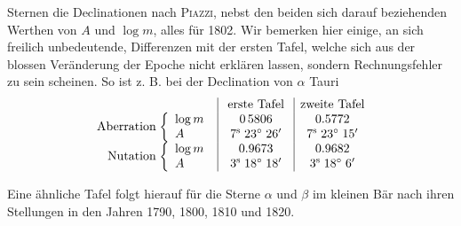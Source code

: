 Sternen die Declinationen nach \textsc{Piazzi}, nebst den beiden sich darauf beziehenden Werthen von $A$ und $\log m$, alles für 1802. Wir bemerken hier einige, an sich freilich unbedeutende, Differenzen mit der ersten Tafel, welche sich aus der blossen Veränderung der Epoche nicht erklären lassen, sondern Rechnungsfehler zu sein scheinen. So ist z. B. bei der Declination von $\alpha$ Tauri \[ \begin{array}{r@{}l|c|c} \multicolumn{2}{c|}{} & \text{erste Tafel} & \text{zweite Tafel}\\ \text{Aberration}\; & \left\{\begin{array}{l}\log m\\ A\end{array}\right. & \begin{array}{c}0\,5806\\7^{\mathrm s}\;23^\circ\;26'\end{array} & \begin{array}{c}0.5772\\7^{\mathrm s}\;23^\circ\;15'\end{array}\\ \text{Nutation}\; & \left\{\begin{array}{l}\log m\\ A\end{array}\right. & \begin{array}{c}0.9673\\3^{\mathrm s}\;18^\circ\;18'\end{array} & \begin{array}{c}0.9682\\3^{\mathrm s}\;18^\circ\;6'\end{array} \end{array} \]

Eine ähnliche Tafel folgt hierauf für die Sterne $\alpha$ und $\beta$ im kleinen Bär nach ihren Stellungen in den Jahren 1790, 1800, 1810 und 1820.

